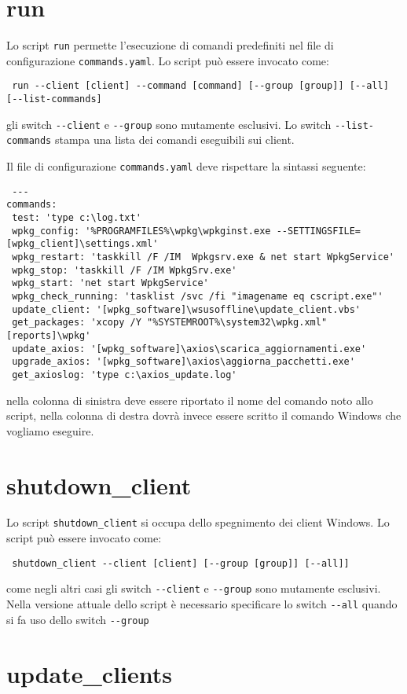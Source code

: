 \documentclass[a4paper,10pt,oneside]{memoir}
\begin{document}
\section*{run}
Lo script \verb#run# permette l'esecuzione di comandi predefiniti nel file di configurazione \verb#commands.yaml#. Lo script può essere invocato come:
\begin{verbatim}
 run --client [client] --command [command] [--group [group]] [--all] [--list-commands]
\end{verbatim}
gli switch \verb#--client# e \verb#--group# sono mutamente esclusivi. Lo switch \verb#--list-commands# stampa una lista dei comandi eseguibili sui client.

Il file di configurazione \verb#commands.yaml# deve rispettare la sintassi seguente:
\begin{verbatim}
 ---
commands:
 test: 'type c:\log.txt'
 wpkg_config: '%PROGRAMFILES%\wpkg\wpkginst.exe --SETTINGSFILE=[wpkg_client]\settings.xml'
 wpkg_restart: 'taskkill /F /IM  Wpkgsrv.exe & net start WpkgService'
 wpkg_stop: 'taskkill /F /IM WpkgSrv.exe'
 wpkg_start: 'net start WpkgService'
 wpkg_check_running: 'tasklist /svc /fi "imagename eq cscript.exe"'
 update_client: '[wpkg_software]\wsusoffline\update_client.vbs'
 get_packages: 'xcopy /Y "%SYSTEMROOT%\system32\wpkg.xml" [reports]\wpkg'
 update_axios: '[wpkg_software]\axios\scarica_aggiornamenti.exe'
 upgrade_axios: '[wpkg_software]\axios\aggiorna_pacchetti.exe'
 get_axioslog: 'type c:\axios_update.log'
\end{verbatim}
nella colonna di sinistra deve essere riportato il nome del comando noto allo script, nella colonna di destra dovrà invece essere scritto il comando Windows che vogliamo eseguire.


\section*{shutdown\_client}
Lo script \verb#shutdown_client# si occupa dello spegnimento dei client Windows. Lo script può essere invocato come:

\begin{verbatim}
 shutdown_client --client [client] [--group [group]] [--all]]
\end{verbatim}
come negli altri casi gli switch \verb#--client# e \verb#--group# sono mutamente esclusivi. Nella versione attuale dello script è necessario specificare lo switch \verb#--all# quando si fa uso dello switch \verb#--group#

\section*{update\_clients}
\end{document}
